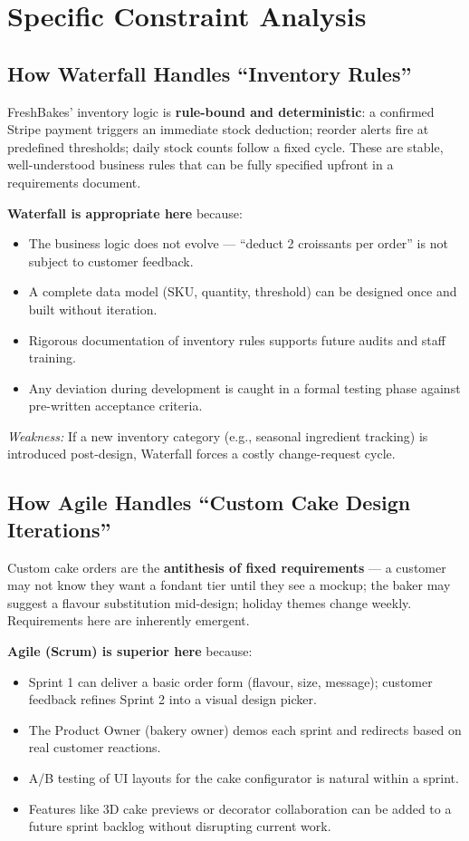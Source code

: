 \documentclass[12pt, a4paper]{report}
\begin{document}
\section{Specific Constraint Analysis}

\subsection{How Waterfall Handles ``Inventory Rules''}

FreshBakes' inventory logic is \textbf{rule-bound and deterministic}: a
confirmed Stripe payment triggers an immediate stock deduction; reorder alerts
fire at predefined thresholds; daily stock counts follow a fixed cycle. These
are stable, well-understood business rules that can be fully specified upfront
in a requirements document.

\textbf{Waterfall is appropriate here} because:
\begin{itemize}[noitemsep]
  \item The business logic does not evolve --- ``deduct 2 croissants per
        order'' is not subject to customer feedback.
  \item A complete data model (SKU, quantity, threshold) can be designed
        once and built without iteration.
  \item Rigorous documentation of inventory rules supports future audits
        and staff training.
  \item Any deviation during development is caught in a formal testing
        phase against pre-written acceptance criteria.
\end{itemize}

\textit{Weakness:} If a new inventory category (e.g., seasonal ingredient
tracking) is introduced post-design, Waterfall forces a costly change-request
cycle.

\subsection{How Agile Handles ``Custom Cake Design Iterations''}

Custom cake orders are the \textbf{antithesis of fixed requirements} --- a
customer may not know they want a fondant tier until they see a mockup; the
baker may suggest a flavour substitution mid-design; holiday themes change
weekly. Requirements here are inherently emergent.

\textbf{Agile (Scrum) is superior here} because:
\begin{itemize}[noitemsep]
  \item Sprint 1 can deliver a basic order form (flavour, size, message);
        customer feedback refines Sprint 2 into a visual design picker.
  \item The Product Owner (bakery owner) demos each sprint and redirects
        based on real customer reactions.
  \item A/B testing of UI layouts for the cake configurator is natural
        within a sprint.
  \item Features like 3D cake previews or decorator collaboration can be
        added to a future sprint backlog without disrupting current work.
\end{itemize}
\end{document}
